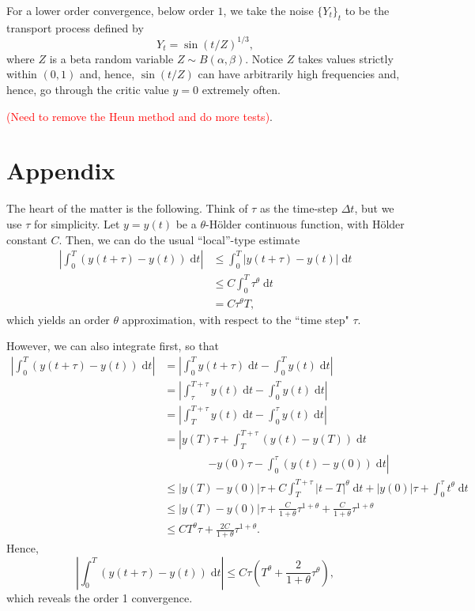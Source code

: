 \documentclass[reqno,12pt]{amsart}
\theoremstyle{plain}%
\theoremstyle{definition}
\begin{document}
For a lower order convergence, below order $1$, we take the noise $\{Y_t\}_t$ to be the transport process defined by
$$
Y_t = \sin(t/Z)^{1/3},
$$
where $Z$ is a beta random variable $Z \sim B(\alpha, \beta)$. Notice $Z$ takes values strictly within $(0, 1)$ and, hence, $\sin(t/Z)$ can have arbitrarily high frequencies and, hence, go through the critic value $y = 0$ extremely often.

\textcolor{red}{(Need to remove the Heun method and do more tests)}.

\section*{Appendix}

The heart of the matter is the following. Think of $\tau$ as the time-step $\Delta t$, but we use $\tau$ for simplicity. Let $y=y(t)$ be a $\theta$-H\"older continuous function, with H\"older constant $C$. Then, we can do the usual ``local''-type estimate
\begin{align*}
    \left|\int_0^T \left(y(t + \tau) - y(t) \right) \;\mathrm{d}t \right| & \leq \int_0^T \left|y(t + \tau) - y(t) \right| \;\mathrm{d}t \\
    & \leq C\int_0^T \tau^{\theta} \;\mathrm{d}t \\
    & = C\tau^{\theta}T,
\end{align*}
which yields an order $\theta$ approximation, with respect to the ``time step" $\tau$.

However, we can also integrate first, so that
\begin{align*}
    \left|\int_0^T \left(y(t + \tau) - y(t) \right) \;\mathrm{d}t \right| & = \left|\int_0^T y(t + \tau) \;\mathrm{d}t - \int_0^T y(t) \;\mathrm{d}t \right| \\ 
    & = \left| \int_\tau^{T+\tau} y(t) \;\mathrm{d}t - \int_0^T y(t) \;\mathrm{d}t \right| \\
    & = \left| \int_T^{T+\tau} y(t) \;\mathrm{d}t - \int_0^\tau y(t) \;\mathrm{d}t \right| \\
    & = \left| y(T)\tau + \int_T^{T+\tau} (y(t) - y(T)) \;\mathrm{d}t \right. \\ 
    & \qquad\qquad \left. - y(0)\tau - \int_0^\tau (y(t) - y(0)) \;\mathrm{d}t \right| \\
    & \leq |y(T) - y(0)|\tau + C\int_T^{T+\tau} |t - T|^\theta \;\mathrm{d}t + |y(0)|\tau + \int_0^\tau t^\theta \;\mathrm{d}t \\
    & \leq |y(T) - y(0)|\tau + \frac{C}{1+\theta}\tau^{1+\theta} + \frac{C}{1+\theta}\tau^{1+\theta} \\
    & \leq CT^{\theta}\tau + \frac{2C}{1+\theta}\tau^{1+\theta}.
\end{align*}
Hence,
\[
    \left|\int_0^T \left(y(t + \tau) - y(t) \right) \;\mathrm{d}t \right| \leq C\tau \left(T^\theta + \frac{2}{1+\theta}\tau^\theta\right),
\]
which reveals the order 1 convergence.
\end{document}
